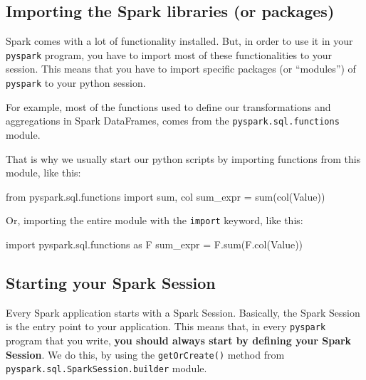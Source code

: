 \documentclass[
  11pt,
  letterpaper,
  DIV=11,
  numbers=noendperiod]{scrreprt}
\newenvironment{Shaded}{\begin{snugshade}}{\end{snugshade}}
\newcommand{\BuiltInTok}[1]{\textcolor[rgb]{0.00,0.23,0.31}{#1}}
\newcommand{\ImportTok}[1]{\textcolor[rgb]{0.00,0.46,0.62}{#1}}
\newcommand{\NormalTok}[1]{\textcolor[rgb]{0.00,0.23,0.31}{#1}}
\newcommand{\OperatorTok}[1]{\textcolor[rgb]{0.37,0.37,0.37}{#1}}
\newcommand{\StringTok}[1]{\textcolor[rgb]{0.13,0.47,0.30}{#1}}
\begin{document}
\hypertarget{importing-the-spark-libraries-or-packages}{%
\subsection{Importing the Spark libraries (or
packages)}\label{importing-the-spark-libraries-or-packages}}

Spark comes with a lot of functionality installed. But, in order to use
it in your \texttt{pyspark} program, you have to import most of these
functionalities to your session. This means that you have to import
specific packages (or ``modules'') of \texttt{pyspark} to your python
session.

For example, most of the functions used to define our transformations
and aggregations in Spark DataFrames, comes from the
\texttt{pyspark.sql.functions} module.

That is why we usually start our python scripts by importing functions
from this module, like this:

\begin{Shaded}
\begin{Highlighting}[]
\ImportTok{from}\NormalTok{ pyspark.sql.functions }\ImportTok{import} \BuiltInTok{sum}\NormalTok{, col}
\NormalTok{sum\_expr }\OperatorTok{=} \BuiltInTok{sum}\NormalTok{(col(}\StringTok{\textquotesingle{}Value\textquotesingle{}}\NormalTok{))}
\end{Highlighting}
\end{Shaded}

Or, importing the entire module with the \texttt{import} keyword, like
this:

\begin{Shaded}
\begin{Highlighting}[]
\ImportTok{import}\NormalTok{ pyspark.sql.functions }\ImportTok{as}\NormalTok{ F}
\NormalTok{sum\_expr }\OperatorTok{=}\NormalTok{ F.}\BuiltInTok{sum}\NormalTok{(F.col(}\StringTok{\textquotesingle{}Value\textquotesingle{}}\NormalTok{))}
\end{Highlighting}
\end{Shaded}

\hypertarget{starting-your-spark-session}{%
\subsection{Starting your Spark
Session}\label{starting-your-spark-session}}

Every Spark application starts with a Spark Session. Basically, the
Spark Session is the entry point to your application. This means that,
in every \texttt{pyspark} program that you write, \textbf{you should
always start by defining your Spark Session}. We do this, by using the
\texttt{getOrCreate()} method from
\texttt{pyspark.sql.SparkSession.builder} module.
\end{document}
